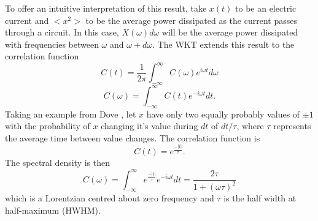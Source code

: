 %
To offer an intuitive interpretation of this result, take $x(t)$ to be an electric current and $<x^2>$ to be the average power dissipated as the current passes through a circuit. In this case, $X(\omega)d\omega$ will be the average power dissipated with frequencies between $\omega$ and $\omega+d\omega$. The WKT extends this result to the correlation function
%
\begin{equation}
C(t)=\frac{1}{2\pi}\int_{-\infty}^{\infty}C(\omega)e^{i\omega t}d\omega
\end{equation}
%
\begin{equation}
C(\omega)=\int_{-\infty}^{\infty}C(t)e^{-i\omega t}dt.
\end{equation}
%
Taking an example from Dove \cite{dove}, let $x$ have only two equally probably values of $\pm 1$ with the probability of $x$ changing it's value during $dt$ of $dt/\tau$, where $\tau$ represents the average time between value changes. The correlation function is
%
\begin{equation}
C(t)=e^{\frac{-|t|}{\tau}}.
\end{equation}
%
The spectral density is then
\begin{equation}
C(\omega)=\int_{-\infty}^{\infty}e^{\frac{-|t|}{\tau}}e^{-i\omega t}dt=\frac{2\tau}{1+(\omega \tau )^2}
\end{equation}
which is a Lorentzian centred about zero frequency and $\tau$ is the half width at half-maximum (HWHM).

